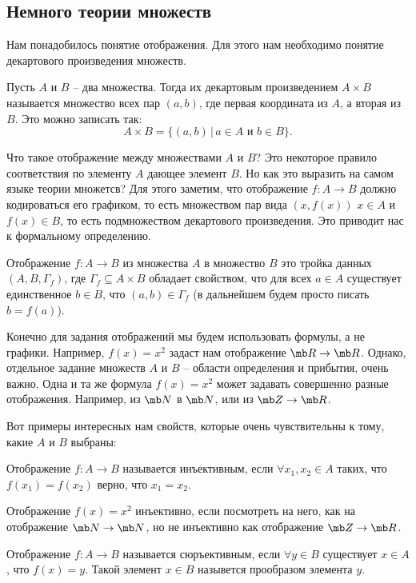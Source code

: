 \subsection{Немного теории множеств}

Нам понадобилось понятие отображения. Для этого нам необходимо понятие декартового произведения множеств.

\dfn Пусть $A$ и $B$ -- два множества. Тогда их декартовым произведением $A\times B$ называется множество всех пар $(a,b)$, где первая координата из $A$, а вторая из $B$. Это можно записать так:
$$ A \times B = \{ (a,b) \, | \, a \in A \text{ и } b \in B \}.$$
\edfn

Что такое отображение между множествами $A$  и $B$? Это некоторое правило соответствия по элементу $A$ дающее элемент $B$. Но как это выразить на самом языке теории множетсв? Для этого заметим, что отображение $f\colon A \to B$ должно кодироваться его графиком, то есть множеством пар вида $(x,f(x))$ $x\in A$ и $f(x)\in B$, то есть подмножеством декартового произведения. Это приводит нас к формальному определению.


\dfn Отображение $f \colon A \to B$ из множества $A$ в множество $B$ это тройка данных $(A,B,\Gamma_f)$, где $\Gamma_f \subseteq A \times B$ обладает свойством, что для всех $a \in A$ существует единственное $b \in B$, что $(a,b) \in \Gamma_f$ (в дальнейшем будем просто писать $b=f(a)$). 
\edfn

Конечно для задания отображений мы будем использовать формулы, а не графики. Например, $f(x)=x^2$ задаст нам отображение $\mb R \to \mb R$. Однако, отдельное задание множеств $A$ и $B$ -- области определения и прибытия, очень важно. Одна и та же формула $f(x)=x^2$ может задавать совершенно разные отображения. Например, из $\mb N$ в $\mb N$, или из $\mb Z \to \mb R$.

Вот примеры интересных нам свойств, которые очень чувствительны к тому, какие $A$ и $B$ выбраны:

\dfn Отображение $f \colon A \to B$ называется инъективным, если $\forall x_1,x_2 \in A$ таких, что $f(x_1)=f(x_2)$ верно, что $x_1=x_2$.
\edfn

Отображение $f(x)=x^2$ инъективно, если посмотреть на него, как на отображение $\mb N \to \mb N$, но не инъективно как отображение $\mb Z \to \mb R$.

\dfn Отображение $f \colon A \to B$ называется сюръективным, если $\forall y\in B$ существует $x \in A$, что $f(x)=y$. Такой элемент $x\in B$ назывется прообразом элемента $y$.
\edfn

